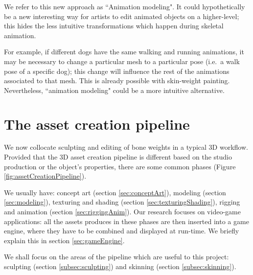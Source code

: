 \documentclass[12pt,twoside]{report}
\begin{document}
We refer to this new approach as ``Animation modeling". It could hypothetically be a new interesting way for artists to edit animated objects on a higher-level; this hides the less intuitive transformations which happen during skeletal animation.

For example, if different dogs have the same walking and running animations, it may be necessary to change a particular mesh to a particular pose (i.e.\ a walk pose of a specific dog); this change will influence the rest of the animations associated to that mesh. This is already possible with skin-weight painting. Nevertheless, ``animation modeling" could be a more intuitive alternative.

\chapter{The asset creation pipeline}
\label{ch:assetpipeline}

We now collocate sculpting and editing of bone weights in a typical 3D workflow. Provided that the 3D asset creation pipeline is different based on the studio production or the object's properties, there are some common phases \cite{dunlop2014production} (Figure  \ref{fig:assetCreationPipeline}).

We usually have: concept art (section \ref{sec:conceptArt}), modeling (section \ref{sec:modeling}), texturing and shading (section \ref{sec:texturingShading}), rigging and animation (section \ref{sec:riggingAnim}).
Our research focuses on video-game applications: all the assets produces in these phases are then inserted into a game engine, where they have to be combined and displayed at run-time. We briefly explain this in section \ref{sec:gameEngine}.

We shall focus on the areas of the pipeline which are useful to this project: sculpting (section \ref{subsec:sculpting}) and skinning (section \ref{subsec:skinning}).
\end{document}
